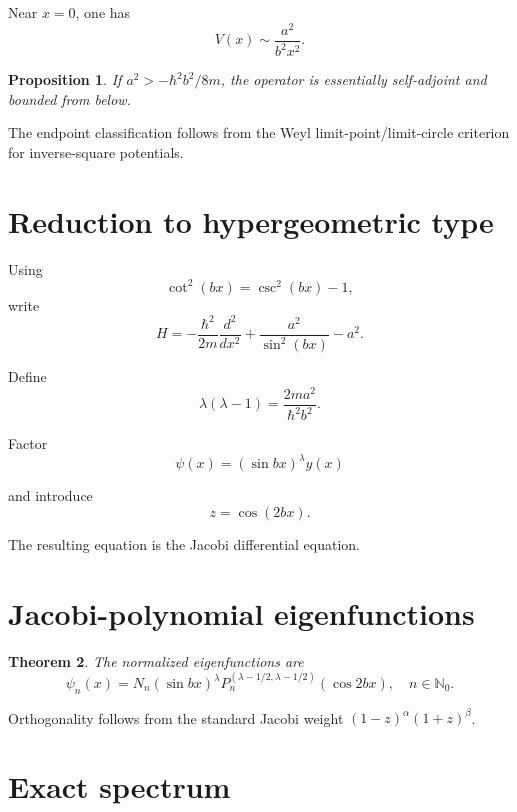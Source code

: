 \documentclass[11pt]{article}
\newtheorem{theorem}{Theorem}[section]
\newtheorem{proposition}[theorem]{Proposition}
\begin{document}
Near $x=0$, one has
\begin{equation}
V(x)\sim \frac{a^2}{b^2 x^2}.
\end{equation}

\begin{proposition}
If $a^2> -\hbar^2 b^2/8m$, the operator is essentially
self-adjoint and bounded from below.
\end{proposition}

The endpoint classification follows from the Weyl limit-point/limit-circle
criterion for inverse-square potentials.

\section{Reduction to hypergeometric type}

Using
\[
\cot^2(bx)=\csc^2(bx)-1,
\]
write
\begin{equation}
H=-\frac{\hbar^2}{2m}\frac{d^2}{dx^2}
+\frac{a^2}{\sin^2(bx)}-a^2.
\end{equation}

Define
\begin{equation}
\lambda(\lambda-1)=\frac{2ma^2}{\hbar^2 b^2}.
\end{equation}

Factor
\begin{equation}
\psi(x)=(\sin bx)^\lambda y(x)
\end{equation}

and introduce
\begin{equation}
z=\cos(2bx).
\end{equation}

The resulting equation is the Jacobi differential equation.

\section{Jacobi-polynomial eigenfunctions}

\begin{theorem}
The normalized eigenfunctions are
\begin{equation}
\psi_n(x)=N_n (\sin bx)^\lambda
P_n^{(\lambda-1/2,\lambda-1/2)}(\cos 2bx),
\quad n\in\mathbb{N}_0.
\end{equation}
\end{theorem}

Orthogonality follows from the standard Jacobi weight
$(1-z)^{\alpha}(1+z)^{\beta}$.

\section{Exact spectrum}
\end{document}
